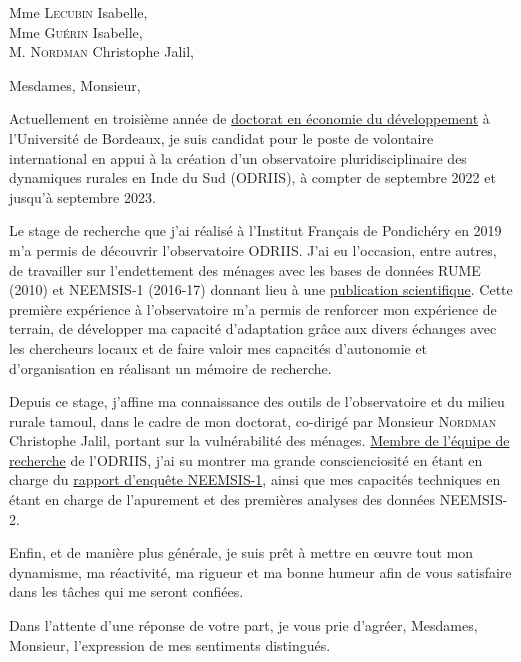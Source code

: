 \documentclass[a4paper,12pt,french]{scrlttr2}
\date{}
\begin{document}
\begin{letter}{Mme \textsc{Lecubin} Isabelle, \\ Mme \textsc{Guérin} Isabelle, \\ M. \textsc{Nordman} Christophe Jalil,}

\opening{Mesdames, Monsieur,}

Actuellement en troisième année de \href{https://www.bse.u-bordeaux.fr/membres/arnaud-natal/}{doctorat en économie du développement} à l'Université de Bordeaux, je suis candidat pour le poste de volontaire international en appui à la création d'un observatoire pluridisciplinaire des dynamiques rurales en Inde du Sud (ODRIIS), à compter de septembre 2022 et jusqu'à septembre 2023.

Le stage de recherche que j'ai réalisé à l'Institut Français de Pondichéry en 2019 m'a permis de découvrir l'observatoire ODRIIS.
J'ai eu l'occasion, entre autres, de travailler sur l'endettement des ménages avec les bases de données RUME (2010) et NEEMSIS-1 (2016-17) donnant lieu à une \href{https://www.researchgate.net/publication/357617209_Surviving_Debt_and_Survival_Debt_in_Times_of_Lockdown}{publication scientifique}.
Cette première expérience à l'observatoire m'a permis de renforcer mon expérience de terrain, de développer ma capacité d'adaptation grâce aux divers échanges avec les chercheurs locaux et de faire valoir mes capacités d'autonomie et d'organisation en réalisant un mémoire de recherche.

Depuis ce stage, j'affine ma connaissance des outils de l'observatoire et du milieu rurale tamoul, dans le cadre de mon doctorat, co-dirigé par Monsieur \textsc{Nordman} Christophe Jalil, portant sur la vulnérabilité des ménages.
\href{https://neemsis.hypotheses.org/team/arnaud-natal}{Membre de l'équipe de recherche} de l'ODRIIS, j'ai su montrer ma grande conscienciosité en étant en charge du \href{https://neemsis.hypotheses.org/ressources/statistical-report}{rapport d'enquête NEEMSIS-1}, ainsi que mes capacités techniques en étant en charge de l'apurement et des premières analyses des données NEEMSIS-2.

Enfin, et de manière plus générale, je suis prêt à mettre en œuvre tout mon dynamisme, ma réactivité, ma rigueur et ma bonne humeur afin de vous satisfaire dans les tâches qui me seront confiées.


\closing{Dans l'attente d'une réponse de votre part, je vous prie d'agréer, Mesdames, Monsieur, l'expression de mes sentiments distingués.}
\end{letter}
\end{document}
